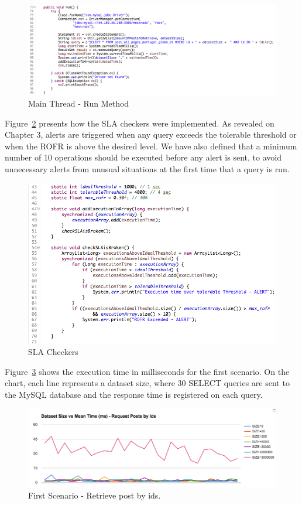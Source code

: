 \begin{figure}[ht!]
\centering
\includegraphics[width=150mm]{Imagens/core-execution-01-2.png}
\caption{Main Thread - Run Method \label{fig:core-execution-01.2}}
\end{figure}


Figure~\ref{fig:core-execution-01.3} presents how the SLA checkers were implemented. As revealed on Chapter 3, alerts are triggered when any query exceeds the tolerable threshold or when the ROFR is above the desired level. We have also defined that a minimum number of 10 operations should be executed before any alert is sent, to avoid unnecessary alerts from unusual situations at the first time that a query is run.

\begin{figure}[ht!]
\centering
\includegraphics[width=120mm]{Imagens/core-execution-01-3.png}
\caption{SLA Checkers \label{fig:core-execution-01.3}}
\end{figure}


Figure~\ref{fig:first_scenario} shows the execution time in milliseconds for the first scenario. On the chart, each line represents a dataset size, where 30 SELECT queries are sent to the MySQL database and the response time is registered on each query.

\begin{figure}
\centering
\includegraphics[width=150mm]{Imagens/execution-01.png}
\caption{First Scenario - Retrieve post by ids.\label{fig:first_scenario}}
\end{figure}

